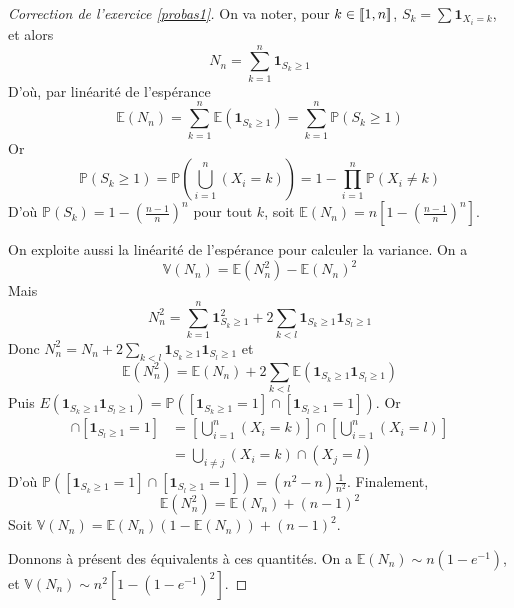 \begin{proof}[Correction de l'exercice \ref{probas1}]
    On va noter, pour $k\in[\![1,n]\!]$, $S_k=\sum\mathbf1_{X_i=k}$, et alors
    \[
        N_n=\sum_{k=1}^n\mathbf1_{S_k\geq 1}    
    \]
    D'où, par linéarité de l'espérance 
    \[
        \mathbb E(N_n)=\sum_{k=1}^n\mathbb E(\mathbf1_{S_k\geq 1})=\sum_{k=1}^n\mathbb P(S_k\geq 1)
    \]
    Or
    \[
        \mathbb P(S_k\geq 1)=\mathbb P\left(\bigcup_{i=1}^n(X_i=k)\right)=1-\prod_{i=1}^n\mathbb P(X_i\neq k)    
    \]
    D'où $\mathbb P(S_k)=1-\left(\frac{n-1}n\right)^n$ pour tout $k$, soit $\mathbb E(N_n)=n\left[1-\left(\frac{n-1}n\right)^n\right]$.

    On exploite aussi la linéarité de l'espérance pour calculer la variance. 
    On a 
    \[
        \mathbb V(N_n)=\mathbb E(N_n^2)-\mathbb E(N_n)^2    
    \]
    Mais 
    \[
        N_n^2=\sum_{k=1}^n\mathbf1_{S_k\geq 1}^2+2\sum_{k<l}\mathbf1_{S_k\geq 1}\mathbf1_{S_l\geq 1}
    \]
    Donc $N_n^2=N_n+2\sum_{k<l}\mathbf1_{S_k\geq 1}\mathbf1_{S_l\geq 1}$ et 
    \[
        \mathbb E(N_n^2)=\mathbb E(N_n)+2\sum_{k<l}\mathbb E(\mathbf1_{S_k\geq 1}\mathbf1_{S_l\geq 1})
    \]
    Puis $E(\mathbf1_{S_k\geq 1}\mathbf1_{S_l\geq 1})=\mathbb P([\mathbf1_{S_k\geq 1}=1]\cap [\mathbf1_{S_l\geq 1}=1])$. 
    Or
    \begin{align*}
        [\mathbf1_{S_k\geq 1}=1]\cap [\mathbf1_{S_l\geq 1}=1]&=\left[\bigcup_{i=1}^n(X_i=k)\right]\cap\left[\bigcup_{i=1}^n(X_i=l)\right]\\
                                                             &=\bigcup_{i\neq j}(X_i=k)\cap(X_j=l)
    \end{align*}
    D'où $\mathbb P([\mathbf1_{S_k\geq 1}=1]\cap [\mathbf1_{S_l\geq 1}=1])=(n^2-n)\frac1{n^2}$.
    Finalement,
    \[
        \mathbb E(N_n^2)=\mathbb E(N_n)+(n-1)^2
    \]
    Soit $\mathbb V(N_n)=\mathbb E(N_n)(1-\mathbb E(N_n)) + (n-1)^2$.

    Donnons à présent des équivalents à ces quantités. 
    On a $\mathbb E(N_n)\sim n(1-e^{-1})$, et $\mathbb V(N_n)\sim n^2[1-(1-e^{-1})^2]$.
\end{proof}

